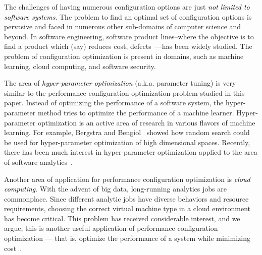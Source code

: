  
 
The challenges of having numerous configuration options are just \textcolor{black}{{\em not limited to software systems}}. The problem to find an optimal set of configuration options is pervasive and faced in numerous other sub-domains of computer science and beyond. In software engineering, software product lines--where the objective is to find a product which (say) reduces cost, defects~\cite{chen2016sampling, henard2015combining}---has been widely studied.  
The problem of configuration optimization is present in domains, such as machine learning, cloud computing, and software security.


The area of \textcolor{black}{{\em hyper-parameter optimization}} (a.k.a.  parameter tuning) is very similar to the performance configuration optimization problem studied in this paper. Instead of optimizing the performance of a software system, the hyper-parameter method tries to optimize the performance of a machine learner. Hyper-parameter optimization is an active area of research in various flavors of machine learning. For example, Bergstra and Bengiol~\cite{bergstra2013making} showed how random search could be used for hyper-parameter optimization of high dimensional spaces.
Recently, there has been much interest in 
hyper-parameter optimization applied to the area of software analytics~\cite{fu2016tuning, fufse17, fu2016differential, tantithamthavorn2016automated, agrawal2016wrong}.

Another area of application for performance configuration optimization is \textcolor{black}{{\em cloud computing}}.  
With the advent of big data, long-running analytics jobs are commonplace. Since different analytic jobs have diverse behaviors and resource requirements, choosing the correct virtual machine type
in a  cloud environment has become critical. This problem has received considerable interest, and we argue, this is another useful application of performance configuration optimization --- that is, optimize the performance of a system while minimizing cost~\cite{alipourfard2017cherrypick, venkataraman2016ernest, yadwadkar2017selecting, Zhu:2017:BTP:3127479.3128605, dalibard2017boat}. 


